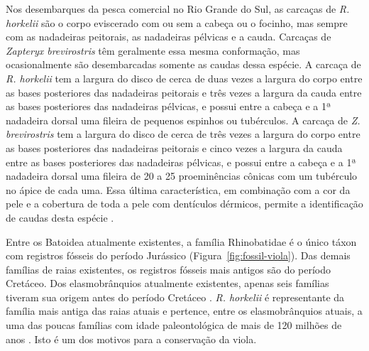 \documentclass[a4paper,11pt,twoside,showtrims,onecolumn,openright,final]{memoir}
\begin{document}
Nos desembarques da pesca comercial no Rio Grande do Sul, as carcaças de \emph{R. horkelii}  
são o corpo eviscerado com ou sem a cabeça ou o focinho, mas sempre com as nadadeiras 
peitorais, as nadadeiras pélvicas e a cauda.  Carcaças de \emph{Zapteryx brevirostris} têm 
geralmente essa mesma conformação, mas ocasionalmente são desembarcadas somente as 
caudas dessa espécie. A carcaça de \emph{R. horkelii}  tem a largura do disco de cerca de duas 
vezes a largura do corpo entre as bases posteriores das nadadeiras peitorais e três vezes 
a largura da cauda  entre as bases posteriores das nadadeiras pélvicas, e possui entre 
a cabeça e a 1ª nadadeira dorsal uma fileira de pequenos espinhos ou tubérculos. 
A carcaça de \emph{Z. brevirostris} tem a largura do disco de cerca de três vezes a largura 
do corpo entre as bases posteriores das nadadeiras peitorais e cinco vezes a largura da 
cauda  entre as bases posteriores das nadadeiras pélvicas, e possui entre a cabeça 
e a 1ª nadadeira dorsal  uma fileira de 20 a 25 proeminências cônicas com um tubérculo 
no ápice de cada uma. Essa última característica, em combinação com a cor da pele e 
a cobertura de toda a pele com dentículos dérmicos, permite a identificação de 
caudas desta espécie  \citep{vooren2003}. %

Entre os Batoidea atualmente existentes, a família Rhinobatidae é o único táxon com 
registros fósseis do período Jurássico (Figura~\ref{fig:fossil-viola}). 
Das demais famílias de raias existentes, os registros fósseis mais antigos são do 
período Cretáceo. Dos elasmobrânquios atualmente existentes, apenas seis famílias 
tiveram sua origem antes do período Cretáceo \citep{cappetta1987}. %
\emph{R. horkelii} é representante da família mais antiga das raias atuais e pertence, entre 
os elasmobrânquios atuais, a uma das poucas famílias com idade paleontológica 
de mais de 120 milhões de anos \citep{cappetta1987}. Isto é um dos motivos para a
conservação da viola.

%
%
\end{document}
